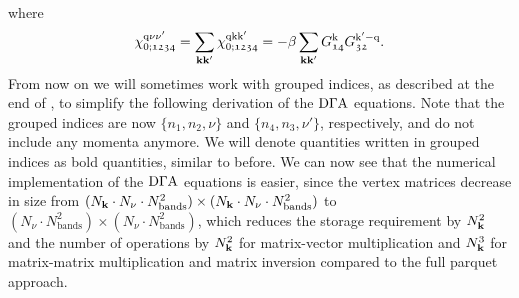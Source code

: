 \documentclass[../../main.tex]{subfiles}
\begin{document}
where
\begin{align}
	\chi_{0;\mathfrak{1234}}^{\text{q}\nu\nu'}=\sum_{\textbf{kk}'}\chi_{0;\mathfrak{1234}}^{\text{q}\text{k}\text{k}'}=-\beta\sum_{\textbf{kk}'}G^{\text{k}}_{\mathfrak{14}}G^{\text{k}'-\text{q}}_{\mathfrak{32}}.
\end{align}
From now on we will sometimes work with grouped indices, as described at the end of , to simplify the following derivation of the $\text{D}\Gamma\text{A}$ equations. Note that the grouped indices are now $\{ n_1,n_2,\nu \}$ and $\{ n_4,n_3,\nu' \}$, respectively, and do not include any momenta anymore. We will denote quantities written in grouped indices as bold quantities, similar to before. We can now see that the numerical implementation of the $\text{D}\Gamma\text{A}$ equations is easier, since the vertex matrices decrease in size from $(N_{\textbf{k}}\cdot N_{\nu} \cdot N_{\text{bands}}^2)\times(N_{\textbf{k}}\cdot N_{\nu} \cdot N_{\text{bands}}^2)$ to $(N_{\nu} \cdot N_{\text{bands}}^2)\times(N_{\nu} \cdot N_{\text{bands}}^2)$, which reduces the storage requirement by $N_{\textbf{k}}^2$ and the number of operations by $N_{\textbf{k}}^2$ for matrix-vector multiplication and $N_{\textbf{k}}^3$ for matrix-matrix multiplication and matrix inversion compared to the full parquet approach.
\end{document}
